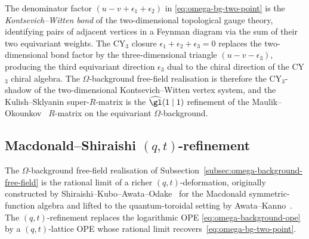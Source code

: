 \begin{remark}
\label{rem:kw-bond-cy3}
The denominator factor $(u - v + \epsilon_1 + \epsilon_2)$ in
\eqref{eq:omega-bg-two-point} is the \emph{Kontsevich--Witten bond}
of the two-dimensional topological gauge theory, identifying pairs
of adjacent vertices in a Feynman diagram via the sum of their two
equivariant weights. The CY$_3$ closure
$\epsilon_1 + \epsilon_2 + \epsilon_3 = 0$ replaces the
two-dimensional bond factor by the three-dimensional triangle
$(u - v - \epsilon_3)$, producing the third equivariant direction
$\epsilon_3$ dual to the chiral direction of the CY$_3$ chiral
algebra. The $\Omega$-background free-field realisation is therefore
the CY$_3$-shadow of the two-dimensional Kontsevich--Witten vertex
system, and the Kulish--Sklyanin super-$R$-matrix is the
$\widehat{\gl}(1 \mid 1)$ refinement of the
Maulik--Okounkov~\cite{MaulikOkounkov2019} $R$-matrix on the
equivariant $\Omega$-background.
\end{remark}

\subsection{Macdonald--Shiraishi $(q, t)$-refinement}
\label{subsec:macdonald-shiraishi-qt}

The $\Omega$-background free-field realisation of
Subsection~\ref{subsec:omega-background-free-field} is the rational
limit of a richer $(q, t)$-deformation, originally constructed by
Shiraishi--Kubo--Awata--Odake~\cite{ShiraishiKuboAwataOdake1996} for
the Macdonald symmetric-function algebra and lifted to the
quantum-toroidal setting by Awata--Kanno~\cite{AwataKanno2008}. The
$(q, t)$-refinement replaces the logarithmic OPE
\eqref{eq:omega-background-ope} by a $(q, t)$-lattice OPE whose
rational limit recovers~\eqref{eq:omega-bg-two-point}.


